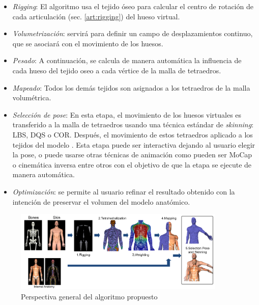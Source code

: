 \begin{itemize}
	\item \emph{Rigging}:   El algoritmo usa el tejido óseo para calcular el centro de rotación de cada articulación (sec. \ref{art:rigging}) del hueso virtual.
     \item \emph{Volumetrización}:   servirá para definir un campo de desplazamientos continuo, que se asociará con el movimiento de los huesos.
\item \emph{Pesado}: A continuación, se calcula de manera automática la influencia de cada hueso del tejido oseo a cada vértice de la malla de tetraedros. 
\item \emph{Mapeado}: Todos los demás tejidos son asignados a los tetraedros de la malla volumétrica. 
\item \emph{Selección de pose}: En esta etapa, el movimiento de los huesos virtuales es transferido a la malla de tetraedros usando una técnica estándar de \emph{skinning}: \ac{LBS}, \ac{DQS} o \ac{COR}. 
Después, el movimiento de estos tetraedros  aplicado a los tejidos del modelo . Esta etapa puede ser interactiva dejando al usuario elegir la pose, o puede usarse otras técnicas de animación como pueden ser \ac{MoCap} o cinemática inversa entre otros con el objetivo de que la etapa se ejecute de manera automática.
\item \emph{Optimización}:  se permite al usuario refinar el resultado obtenido con la intención de preservar el volumen del modelo anatómico.
\end{itemize}

\begin{figure}[!th]
   \centering
    \includegraphics[width=0.9\textwidth]{IMG/resumencasa2.png}
    \caption{Perspectiva general del algoritmo propuesto}
		\label{fig:Resumen}
\end{figure}


